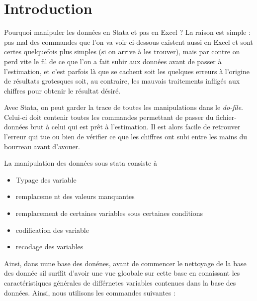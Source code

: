 \documentclass[
]{book}
\providecommand{\tightlist}{%
  \setlength{\itemsep}{0pt}\setlength{\parskip}{0pt}}
\begin{document}
\hypertarget{introduction}{%
\section{Introduction}\label{introduction}}

Pourquoi manipuler les données en Stata et pas en Excel ? La raison est simple : pas mal des commandes que l'on va voir ci-dessous existent aussi en Excel et sont certes quelquefois plus simples (si on arrive à les trouver), mais par contre on perd vite le fil de ce que l'on a fait subir aux données avant de passer à l'estimation, et c'est parfois là que se cachent soit les quelques erreurs à l'origine de résultats grotesques soit, au contraire, les mauvais traitements infligés aux chiffres pour obtenir le résultat désiré.

Avec Stata, on peut garder la trace de toutes les manipulations dans le \emph{do-file}. Celui-ci doit contenir toutes les commandes permettant de passer du fichier-données brut à celui qui est prêt à l'estimation. Il est alors facile de retrouver l'erreur qui tue ou bien de vérifier ce que les chiffres ont subi entre les mains du bourreau avant d'avouer.

La manipulation des données sous stata consiste à

\begin{itemize}
\tightlist
\item
  Typage des variable
\item
  remplaceme nt des valeurs manquantes
\item
  remplacement de certaines variables sous certaines conditions
\item
  codification des variable
\item
  recodage des variables
\end{itemize}

Ainsi, dans uune base des donénes, avant de commencer le nettoyage de la base des donnée sil surffit d'avoir une vue gloobale sur cette base en conaissant les caractéristiques générales de différnetes variables contenues dans la base des données.
Ainsi, nous utilisons les commandes suivantes :
\end{document}

